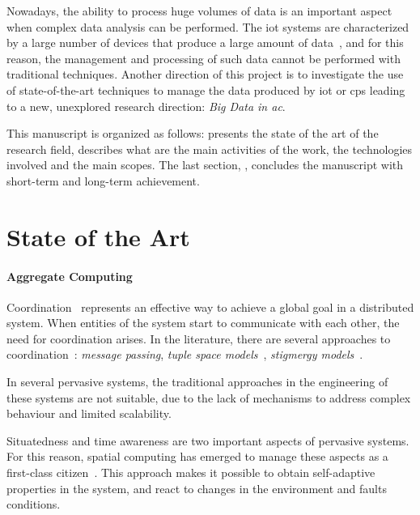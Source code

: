 \documentclass[12pt]{article}
\begin{document}
Nowadays,
the ability to process huge volumes of data is an important aspect when complex data analysis can be performed.
%
The \ac{iot} systems are characterized by a large number of devices that produce a large amount of data~\cite{DBLP:journals/fgcs/GeBB18,DBLP:journals/iotj/Sasaki22},
and for this reason,
the management and processing of such data cannot be performed with traditional techniques.
%
Another direction of this project is to investigate the use of state-of-the-art techniques to manage the data produced by \ac{iot} or \ac{cps}
leading to a new, unexplored research direction: \emph{Big Data in \ac{ac}}.

This manuscript is organized as follows:
 presents the state of the art of the research field,
 describes what are the main activities of the work,
the technologies involved and the main scopes.
%
The last section, , concludes the manuscript with short-term and long-term achievement.


\section{State of the Art}\label{sec:state-of-the-art}

\paragraph{Aggregate Computing}
Coordination~\cite{DBLP:journals/csur/Ciancarini96} represents an effective way to achieve a global goal in a distributed system.
%
When entities of the system start to communicate with each other,
the need for coordination arises.
%
In the literature,
there are several approaches to coordination~\cite{DBLP:journals/csur/Ciancarini96}:
\emph{message passing}, \emph{tuple space models}~\cite{DBLP:books/sp/omicini01/RossiCD01}, \emph{stigmergy models}~\cite{DBLP:journals/cogsr/Heylighen16}.

In several pervasive systems,
the traditional approaches in the engineering of these systems are not suitable,
due to the lack of mechanisms to address complex behaviour and limited scalability.

Situatedness and time awareness are two important aspects of pervasive systems.
%
For this reason,
spatial computing has emerged to manage these aspects as a first-class citizen~\cite{Beal_Viroli_2015}.
%
This approach makes it possible to obtain self-adaptive properties in the system,
and react to changes in the environment and faults conditions.
\end{document}
